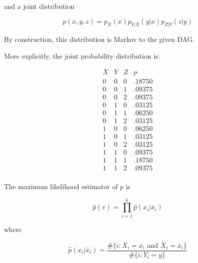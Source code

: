 and a joint distribution

\[ p(x, y, z) = p_X(x) p_{Y | X}(y | x) p_{Z | Y}(z | y) \]

By construction, this distribution is Markov to the given DAG.

More explicitly, the joint probability distribution is:

\[
\begin{array}{ccc|c}
X & Y & Z & p \\
\hline
0 & 0 & 0 & .18750 \\
0 & 0 & 1 & .09375 \\
0 & 0 & 2 & .09375 \\
0 & 1 & 0 & .03125 \\
0 & 1 & 1 & .06250 \\
0 & 1 & 2 & .03125 \\
1 & 0 & 0 & .06250 \\
1 & 0 & 1 & .03125 \\
1 & 0 & 2 & .03125 \\
1 & 1 & 0 & .09375 \\
1 & 1 & 1 & .18750 \\
1 & 1 & 2 & .09375 \\
\end{array}
\]

The maximum likelihood estimator of \(p\) is

\[ \hat{p}(v) = \prod_{i=1}^k \hat{p}(x_i | \overline{x}_i) \]

where

\[ \hat{p}(x_i | \overline{x}_i) = \frac{\# \{i : X_i = x_i \text{ and } \overline{X}_i = \overline{x}_i \}}{\# \{i : Y_i = y \}} \]

